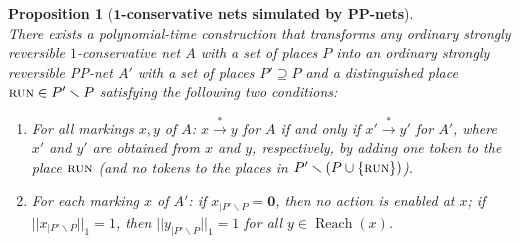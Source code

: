 \documentclass[11pt,a4paper]{amsart}
\DeclareMathOperator{\Reach}{Reach}
\newcommand{\step}[1]{\mathrel{\xrightarrow{#1}}}
\newcommand{\normone}[1]{||#1||_1}
\newcommand{\prun}{\textsc{run}}
\newcommand{\restr}[1]{_{|{#1}}}
\let\origtextsc\textsc
\renewcommand{\textsc}[1]{\textnormal{\origtextsc{#1}}}
\theoremstyle{plain}
\newtheorem{prop}[thm]{Proposition}
\theoremstyle{definition}
\theoremstyle{defC}
\theoremstyle{thmC}
\begin{document}
\begin{prop}[\textbf{$\bm{1}$-conservative nets simulated by PP-nets}]\label{prop:constoPP}
\hfill\\	
There exists a polynomial-time construction that transforms
any ordinary strongly reversible $1$-conservative net $A$ with a
set of places $P$ 
into an ordinary strongly reversible PP-net $A'$ with a
	set of places $P'\supseteq P$ and a distinguished place
	$\prun\in P'\smallsetminus P$ satisfying the following two
	conditions:
\begin{enumerate}
	\item		
For all markings $x,y$ of $A$:
		$x \step{*} y$ for $A$ if and only if $x' \step{*} y'$ for
		$A'$, where $x'$ and $y'$ are obtained from $x$ and $y$,
		respectively, by
		adding one token to the place $\prun$ (and no tokens to the
		places in $P'\smallsetminus (P\cup\{\prun\})$).
    \item
For each marking $x$ of $A'$:
		if $x\restr{P'\smallsetminus P}=\mathbf{0}$, then no
		action is enabled at $x$; if 
		$\normone{x\restr{P'\smallsetminus P}}=1$, then  
		$\normone{y\restr{P'\smallsetminus P}}=1$ for all
		$y\in\Reach(x)$.
\end{enumerate}
\end{prop}
\end{document}
